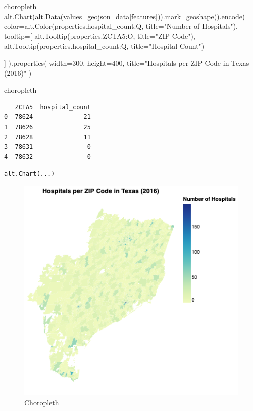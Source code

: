 \documentclass[
  letterpaper,
  DIV=11,
  numbers=noendperiod]{scrartcl}
\newenvironment{Shaded}{\begin{snugshade}}{\end{snugshade}}
\newcommand{\DecValTok}[1]{\textcolor[rgb]{0.68,0.00,0.00}{#1}}
\newcommand{\NormalTok}[1]{\textcolor[rgb]{0.00,0.23,0.31}{#1}}
\newcommand{\OperatorTok}[1]{\textcolor[rgb]{0.37,0.37,0.37}{#1}}
\newcommand{\StringTok}[1]{\textcolor[rgb]{0.13,0.47,0.30}{#1}}
\begin{document}
\begin{Shaded}
\begin{Highlighting}[]
\NormalTok{choropleth }\OperatorTok{=}\NormalTok{ alt.Chart(alt.Data(values}\OperatorTok{=}\NormalTok{geojson\_data[}\StringTok{\textquotesingle{}features\textquotesingle{}}\NormalTok{])).mark\_geoshape().encode(}
\NormalTok{    color}\OperatorTok{=}\NormalTok{alt.Color(}\StringTok{\textquotesingle{}properties.hospital\_count:Q\textquotesingle{}}\NormalTok{, title}\OperatorTok{=}\StringTok{"Number of Hospitals"}\NormalTok{),}
\NormalTok{    tooltip}\OperatorTok{=}\NormalTok{[}
\NormalTok{        alt.Tooltip(}\StringTok{\textquotesingle{}properties.ZCTA5:O\textquotesingle{}}\NormalTok{, title}\OperatorTok{=}\StringTok{"ZIP Code"}\NormalTok{),}
\NormalTok{        alt.Tooltip(}\StringTok{\textquotesingle{}properties.hospital\_count:Q\textquotesingle{}}\NormalTok{, title}\OperatorTok{=}\StringTok{"Hospital Count"}\NormalTok{)}
        
\NormalTok{    ]}
\NormalTok{).properties(}
\NormalTok{    width}\OperatorTok{=}\DecValTok{300}\NormalTok{,}
\NormalTok{    height}\OperatorTok{=}\DecValTok{400}\NormalTok{,}
\NormalTok{    title}\OperatorTok{=}\StringTok{"Hospitals per ZIP Code in Texas (2016)"}
\NormalTok{)}

\NormalTok{choropleth}
\end{Highlighting}
\end{Shaded}

\begin{verbatim}
   ZCTA5  hospital_count
0  78624              21
1  78626              25
2  78628              11
3  78631               0
4  78632               0
\end{verbatim}

\begin{verbatim}
alt.Chart(...)
\end{verbatim}

\begin{figure}[H]

{\centering \includegraphics{3-2.png}

}

\caption{Choropleth}

\end{figure}%
\end{document}
